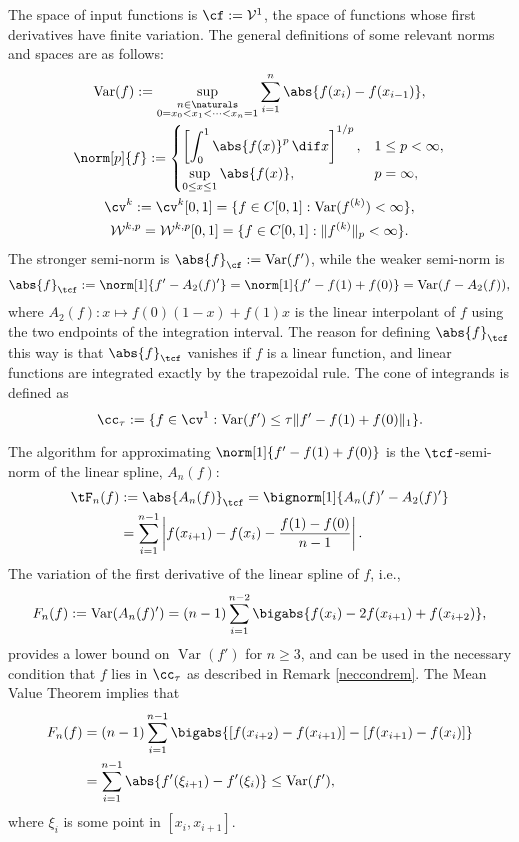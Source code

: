 \documentclass{iitthesis}
\DeclareMathOperator{\Var}{Var}
\theoremstyle{definition}
\theoremstyle{remark}
\newcommand{\Fnorm}[1]{\abs{#1}_{\cf}}
\newcommand{\Ftnorm}[1]{\abs{#1}_{\tcf}}
\begin{document}
The space of input functions is $\cf:=\mathcal{V}^{1}$, the space of functions whose first derivatives have finite variation.  The general definitions of some relevant norms and spaces are as follows:
\begin{subequations} \label{defSobolev}
\begin{gather}
\Var(f) := \sup_{\substack{n \in \naturals\\ 0 = x_0 < x_1 < \cdots < x_{n} =1}} \sum_{i=1}^n \abs{f(x_i)-f(x_{i-1})}, \\
\norm[p]{f}:= \begin{cases} \displaystyle \left[\int_0^1 \abs{f(x)}^p \, \dif x \right]^{1/p}, & 1 \le p < \infty,\\[1ex]
\displaystyle  \sup_{0 \le x \le 1} \abs{f(x)}, & p=\infty,
\end{cases}
\\
\cv^{k}: =\cv^{k}[0,1]=\{f\in C[0,1]: \Var(f^{(k)}) < \infty \}, \\
\mathcal{W}^{k,p}=\mathcal{W}^{k,p}[0,1]=\{f\in C[0,1]: \|f^{(k)}\|_{p}<\infty\}.
\end{gather}
\end{subequations}
The stronger semi-norm is $\Fnorm{f}:=\Var(f')$, while the weaker semi-norm is
\[
\Ftnorm{f}:=\norm[1]{f'-A_2(f)'}=\norm[1]{f'-f(1)+f(0)}=\Var(f-A_2(f)),
\]
where $A_2(f): x \mapsto f(0)(1-x)+f(1)x$ is the linear interpolant of $f$ using the two endpoints of the integration interval. The reason for defining $\Ftnorm{f}$ this way is that $\Ftnorm{f}$ vanishes if $f$ is a linear function, and linear functions are integrated exactly by the trapezoidal rule.  The cone of integrands is defined as
\begin{equation}\label{coneinteg}
\cc_{\tau}:=\{f\in \cv^{1}:\Var(f')\leq\tau\|f'-f(1)+f(0)\|_1\}.
\end{equation}

The algorithm for approximating $\norm[1]{f'-f(1)+f(0)}$ is the $\tcf$-semi-norm of the linear spline, $A_n(f)$:
\begin{align}
\nonumber
\tF_n(f)&:=\Ftnorm{A_n(f)}=\bignorm[1]{A_n(f)'-A_2(f)'} \\
\label{1direst}
&=\sum_{i=1}^{n-1}\left|f(x_{i+1})-f(x_{i}) - \frac{f(1)-f(0)}{n-1}\right|.
\end{align}
The variation of the first derivative of the linear spline of $f$, i.e.,
\begin{equation} \label{Fnormalg}
F_n(f) :=\Var(A_n(f)') = (n-1)\sum_{i=1}^{n-2} \bigabs{f(x_i) - 2 f(x_{i+1})+f(x_{i+2})},
\end{equation}
provides a lower bound on $\Var(f')$ for $n \ge 3$, and can be used in the necessary condition that $f$ lies in $\cc_\tau$ as described in Remark \ref{neccondrem}.
The Mean Value Theorem implies that
\begin{align*}
F_n(f) &= (n-1)\sum_{i=1}^{n-1} \bigabs{[f(x_{i+2}) - f(x_{i+1})] - [f(x_{i+1}) - f(x_{i})]} \\
&= \sum_{i=1}^{n-1} \abs{f'(\xi_{i+1}) - f'(\xi_{i})} \le \Var(f'),
\end{align*}
where $\xi_i$ is some point in $[x_i,x_{i+1}]$.
\end{document}
